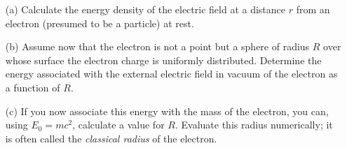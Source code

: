 \documentclass[12pt,letterpaper,boxed,cm]{hmcpset}
\begin{document}
\begin{problem}[SUP4*]
	\begin{enumerate}
		\item[(a)] Calculate the energy density of the electric field at a distance $r$ from an electron (presumed to be a particle) at rest.
		\item[(b)] Assume now that the electron is not a point but a sphere of radius $R$ over whose surface the electron charge is uniformly distributed. Determine the energy associated with the external electric field in vacuum of the electron as a function of $R$.
		\item[(c)] If you now associate this energy with the mass of the electron, you can, using $E_0 = mc^2$, calculate a value for $R$. Evaluate this radius numerically; it is often called the \textit{classical radius} of the electron.
	\end{enumerate}
\end{problem}
\begin{solution}
\end{solution}
\end{document}
